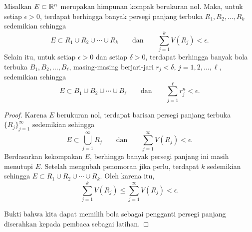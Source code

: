 \begin{prop} \label{mv:prop:compactnull}
Misalkan $E\subset{\mathbb{R}}^n$ merupakan himpunan kompak berukuran nol. Maka, untuk
setiap $\epsilon>0$, terdapat berhingga banyak persegi panjang terbuka
$R_1,R_2,\ldots,R_k$ sedemikian sehingga
\begin{equation*}
E \subset R_1 \cup R_2 \cup \cdots \cup R_k
\qquad \text{dan} \qquad
\sum_{j=1}^k V(R_j) < \epsilon.
\end{equation*}
Selain itu, untuk setiap $\epsilon>0$ dan setiap $\delta>0$, terdapat berhingga
banyak bola terbuka $B_1,B_2,\ldots,B_{\ell}$, masing-masing berjari-jari
$r_j<\delta$, $j=1,2,\ldots,\ell$, sedemikian sehingga
\begin{equation*}
E \subset B_1 \cup B_2 \cup \cdots \cup B_{\ell}
\qquad \text{dan} \qquad
\sum_{j=1}^{\ell} r_j^n < \epsilon.
\end{equation*}
\end{prop}

\begin{proof}
Karena $E$ berukuran nol, terdapat barisan persegi panjang terbuka
$\{R_j\}_{j=1}^\infty$ sedemikian sehingga
\begin{equation*}
E \subset \bigcup_{j=1}^\infty R_j
\qquad \text{dan} \qquad
\sum_{j=1}^\infty V(R_j) < \epsilon.
\end{equation*}
Berdasarkan kekompakan $E$, berhingga banyak persegi panjang ini masih menutupi
$E$.
Setelah mengubah penomoran jika perlu, terdapat $k$ sedemikian sehingga
$E\subset R_1\cup R_2\cup\cdots\cup R_k$. Oleh karena itu,
\begin{equation*}
\sum_{j=1}^k V(R_j) \leq
\sum_{j=1}^\infty V(R_j) < \epsilon.
\end{equation*}

Bukti bahwa kita dapat memilih bola sebagai pengganti persegi panjang
diserahkan kepada pembaca sebagai latihan.
\end{proof}

